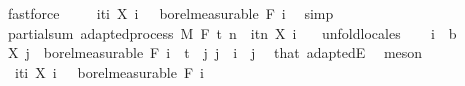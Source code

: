 \begin{isabellebody}
\ fastforce\isanewline
\ \ \isamarkupfalse%
\ {\isachardoublequoteopen}{\isacharparenleft}{\kern0pt}{\isasymlambda}{\isasymxi}{\isachardot}{\kern0pt}\ {\isasymSum}i{\isasymin}{\isacharbraceleft}{\kern0pt}ti{\isacharbraceright}{\kern0pt}{\isachardot}{\kern0pt}\ X\ i\ {\isasymxi}{\isacharparenright}{\kern0pt}\ {\isasymin}\ borel{\isacharunderscore}{\kern0pt}measurable\ {\isacharparenleft}{\kern0pt}F\ i{\isacharparenright}{\kern0pt}{\isachardoublequoteclose}\ \isamarkupfalse%
\ simp\isanewline
{}\isamarkupfalse%
%
\endisatagproof
{\isafoldproof}%
%
\isadelimproof
\isanewline
%
\endisadelimproof
\isanewline
{}\isamarkupfalse%
\ partial{\isacharunderscore}{\kern0pt}sum{\isacharprime}{\kern0pt}{\isacharcolon}{\kern0pt}\ {\isachardoublequoteopen}adapted{\isacharunderscore}{\kern0pt}process\ M\ F\ t\ {\isacharparenleft}{\kern0pt}{\isasymlambda}n\ {\isasymxi}{\isachardot}{\kern0pt}\ {\isasymSum}i{\isasymin}{\isacharbraceleft}{\kern0pt}tn{\isacharbraceright}{\kern0pt}{\isachardot}{\kern0pt}\ X\ i\ {\isasymxi}{\isacharparenright}{\kern0pt}{\isachardoublequoteclose}\ \isanewline
%
\isadelimproof
%
\endisadelimproof
%
\isatagproof
{}\isamarkupfalse%
\ {\isacharparenleft}{\kern0pt}unfold{\isacharunderscore}{\kern0pt}locales{\isacharparenright}{\kern0pt}\isanewline
\ \ \isamarkupfalse%
\ i\ {\isacharcolon}{\kern0pt}{\isacharcolon}{\kern0pt}\ {\isacharprime}{\kern0pt}b\isanewline
\ \ \isamarkupfalse%
\ {\isachardoublequoteopen}X\ j\ {\isasymin}\ borel{\isacharunderscore}{\kern0pt}measurable\ {\isacharparenleft}{\kern0pt}F\ i{\isacharparenright}{\kern0pt}{\isachardoublequoteclose}\ \ {\isachardoublequoteopen}t\ {\isasymle}\ j{\isachardoublequoteclose}\ {\isachardoublequoteopen}j\ {\isasymle}\ i{\isachardoublequoteclose}\ \ j\ \isamarkupfalse%
\ that\ adaptedE\ \isamarkupfalse%
\ meson\isanewline
\ \ \isamarkupfalse%
\ {\isachardoublequoteopen}{\isacharparenleft}{\kern0pt}{\isasymlambda}{\isasymxi}{\isachardot}{\kern0pt}\ {\isasymSum}i{\isasymin}{\isacharbraceleft}{\kern0pt}ti{\isacharbraceright}{\kern0pt}{\isachardot}{\kern0pt}\ X\ i\ {\isasymxi}{\isacharparenright}{\kern0pt}\ {\isasymin}\ borel{\isacharunderscore}{\kern0pt}measurable\ {\isacharparenleft}{\kern0pt}F\ i{\isacharparenright}{\kern0pt}{\isachardoublequoteclose}\ \isamarkupfalse%

\end{isabellebody}
